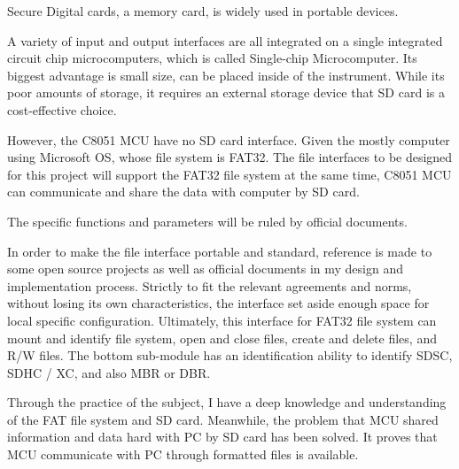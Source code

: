 \begin{englishabstract}

Secure Digital cards, 
a memory card, is widely used in portable devices.

A variety of input and output interfaces are all integrated on a single integrated circuit chip microcomputers,
which is called Single-chip Microcomputer.
Its biggest advantage is small size, can be placed inside of the instrument.
While its poor amounts of storage, it requires an external storage device that SD card is a cost-effective choice.

However, the C8051 MCU have no SD card interface.
Given the mostly computer using Microsoft OS, whose file system is FAT32.
The file interfaces to be designed for this project will support the FAT32 file system at the same time,
C8051 MCU can communicate and share the data with computer by SD card.

The specific functions and parameters will be ruled by official documents.

In order to make the file interface portable and standard, 
reference is made to some open source projects as well as official documents in my design and implementation process.
Strictly to fit the relevant agreements and norms, without losing its own characteristics,
the interface set aside enough space for local specific configuration.
Ultimately, this interface for FAT32 file system can mount and identify file system, open and close files,
create and delete files, and R/W files.
The bottom sub-module has an identification ability to identify SDSC, SDHC / XC, and also MBR or DBR.

Through the practice of the subject, I have a deep knowledge and understanding of the FAT
file system and SD card. Meanwhile, the problem that  MCU shared information and data hard with PC by SD card
has been solved. It proves that MCU communicate with PC through formatted files is available.

\end{englishabstract}

